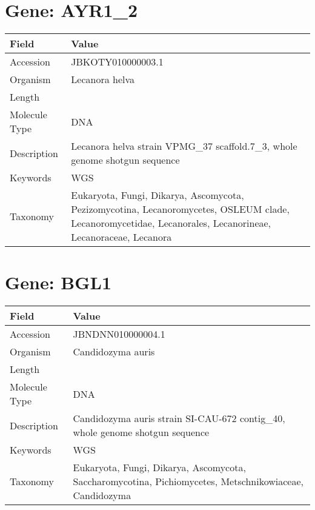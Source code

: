 \documentclass[10pt]{article}
\begin{document}
\section*{Gene: AYR1\_2}
{\footnotesize
\begin{longtable}{>{\raggedright\arraybackslash}p{4.5cm} >{\raggedright\arraybackslash}p{11.5cm}}
\textbf{Field} & \textbf{Value} \\
\hline
Accession & JBKOTY010000003.1 \\
Organism & Lecanora helva \\
Length & 3154666 \\
Molecule Type & DNA \\
Description & Lecanora helva strain VPMG\_37 scaffold.7\_3, whole genome shotgun sequence \\
Keywords & WGS \\
Taxonomy & Eukaryota, Fungi, Dikarya, Ascomycota, Pezizomycotina, Lecanoromycetes, OSLEUM clade, Lecanoromycetidae, Lecanorales, Lecanorineae, Lecanoraceae, Lecanora \\
\end{longtable}
}


\section*{Gene: BGL1}
{\footnotesize
\begin{longtable}{>{\raggedright\arraybackslash}p{4.5cm} >{\raggedright\arraybackslash}p{11.5cm}}
\textbf{Field} & \textbf{Value} \\
\hline
Accession & JBNDNN010000004.1 \\
Organism & Candidozyma auris \\
Length & 779665 \\
Molecule Type & DNA \\
Description & Candidozyma auris strain SI-CAU-672 contig\_40, whole genome shotgun sequence \\
Keywords & WGS \\
Taxonomy & Eukaryota, Fungi, Dikarya, Ascomycota, Saccharomycotina, Pichiomycetes, Metschnikowiaceae, Candidozyma \\
\end{longtable}
}
\end{document}
